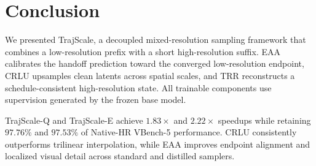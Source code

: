 \section{Conclusion}

We presented TrajScale, a decoupled mixed-resolution sampling framework
that combines a low-resolution prefix with a short high-resolution suffix.
EAA calibrates the handoff prediction toward the converged low-resolution
endpoint, CRLU upsamples clean latents across spatial scales, and TRR
reconstructs a schedule-consistent high-resolution state. All trainable
components use supervision generated by the frozen base model.

TrajScale-Q and TrajScale-E achieve \(1.83\times\) and \(2.22\times\) speedups
while retaining \(97.76\%\) and \(97.53\%\) of Native-HR VBench-5
performance. CRLU consistently outperforms trilinear interpolation,
while EAA improves endpoint alignment and localized visual detail across
standard and distilled samplers.

